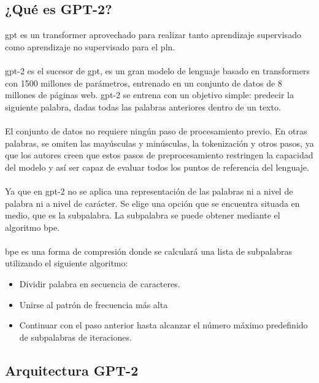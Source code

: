 \documentclass[12pt, a4paper, titlepage]{report}
\begin{document}
		        \subsection{¿Qué es GPT-2?}  
		        \acrfull{gpt} es un transformer aprovechado para realizar tanto aprendizaje supervisado como aprendizaje no supervisado para el \acrfull{pln}.\\\\        
		        \acrshort{gpt}-2 es el sucesor de \acrshort{gpt}, es un gran modelo de lenguaje basado en transformers con 1500 millones de parámetros, entrenado en un conjunto de datos de 8 millones de páginas web. \acrshort{gpt}-2 se entrena con un objetivo simple: predecir la siguiente palabra, dadas todas las palabras anteriores dentro de un texto. \cite{refQueesgpt}\\\\
		        El conjunto de datos no requiere ningún paso de procesamiento previo. En otras palabras, se omiten las mayúsculas y minúsculas, la tokenización y otros pasos, ya que los autores creen que estos pasos de preprocesamiento restringen la capacidad del modelo y así ser capaz de evaluar todos los puntos de referencia del lenguaje.\\\\        
		        Ya que en \acrshort{gpt}-2 no se aplica una representación de las palabras ni a nivel de palabra ni a nivel de carácter. Se elige una opción que se encuentra situada en medio, que es la subpalabra. La subpalabra se puede obtener mediante el algoritmo \acrfull{bpe}.\\\\
		        \acrshort{bpe} es una forma de compresión donde se calculará una lista de subpalabras utilizando el siguiente algoritmo: \cite{refbpe}
		        \begin{itemize}
		        	\item Dividir palabra en secuencia de caracteres.
		        	\item Unirse al patrón de frecuencia más alta
		        	\item Continuar con el paso anterior hasta alcanzar el número máximo predefinido de subpalabras de iteraciones.
		        \end{itemize}
		    
		    	\subsection{Arquitectura GPT-2}
		    	
\end{document}
